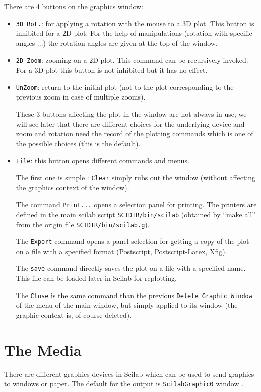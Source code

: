 There are 4 buttons on the graphics window:
\begin{itemize}
	\item \verb+3D Rot.+: for applying a rotation with the mouse to a
3D plot. This button is inhibited for a 2D plot. For the help of
manipulations (rotation with specific angles ...) the rotation angles 
are given at the top of the window.
	\item \verb+2D Zoom+: zooming on a 2D plot. This command can be
recursively invoked. For a 3D plot this button is not inhibited but it
has no effect.
	\item \verb+UnZoom+: return to the initial plot (not to the plot
corresponding to the previous zoom in case of multiple zooms).

These 3 buttons affecting the plot in the window are not always in
use; we will see later that there are different choices for the 
underlying device and zoom and rotation need the record of the
plotting commands which is one of the possible choices (this is the
default).

	
	\item \verb+File+: this button opens different commands and menus.

The first one is simple : {\tt Clear} simply rubs out the window
(without affecting the graphics context of the window).

The command {\tt Print...} opens a selection panel for printing. 
The printers are defined in the main scilab script 
{\tt SCIDIR/bin/scilab} (obtained by ``make all'' from the origin 
file {\tt SCIDIR/bin/scilab.g}).

The {\tt Export} command opens a panel selection for getting a copy of the 
plot on a file with a specified format (Postscript, Postscript-Latex, Xfig).

The {\tt save} command directly saves the plot on a file with a
specified name. This file can be loaded later in Scilab for replotting.

The {\tt Close} is the same command than the previous {\tt Delete
Graphic Window} of the menu of the main window, but simply 
applied to its window (the graphic context is, of course deleted). 

\end{itemize}

 
\section{The Media}
There are different graphics devices in Scilab which can be used to send
graphics to windows or paper. The default for the output is 
\verb+ScilabGraphic0+ window .

